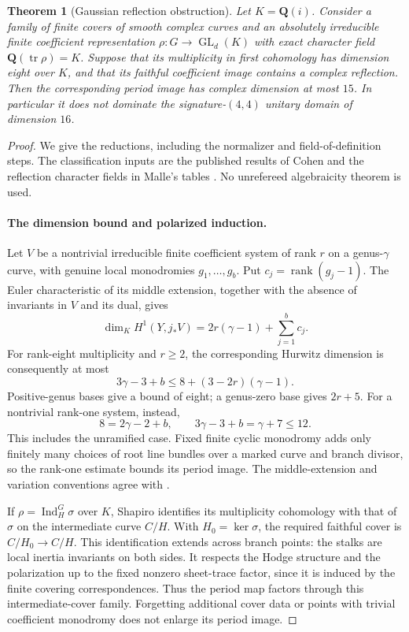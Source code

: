 \documentclass[11pt]{article}
\newtheorem{theorem}{Theorem}[section]
\theoremstyle{definition}
\theoremstyle{remark}
\newcommand{\Q}{\mathbf Q}
\begin{document}
\begin{theorem}[Gaussian reflection obstruction]\label{thm:gaussian-reflections}
Let $K=\Q(i)$. Consider a family of finite covers of smooth complex
curves and an absolutely irreducible finite coefficient representation
$\rho:G\to\operatorname{GL}_d(K)$ with exact character field
$\Q(\operatorname{tr}\rho)=K$. Suppose that its multiplicity in first
cohomology has dimension eight over $K$, and that its faithful coefficient
image contains a complex reflection. Then the corresponding period image
has complex dimension at most $15$. In particular it does not dominate
the signature-$(4,4)$ unitary domain of dimension $16$.
\end{theorem}

\begin{proof}
We give the reductions, including the normalizer and field-of-definition
steps. The classification inputs are the published results of Cohen
\cite{CohenReflection,CohenCorrection} and the reflection character fields
in Malle's tables \cite{MalleFields}. No unrefereed algebraicity theorem
is used.

\paragraph{The dimension bound and polarized induction.}
Let $V$ be a nontrivial irreducible finite coefficient system of rank $r$
on a genus-$\gamma$ curve, with genuine local monodromies $g_1,\ldots,g_b$.
Put $c_j=\operatorname{rank}(g_j-1)$. The Euler characteristic of its middle extension,
together with the absence of invariants in $V$ and its dual, gives
\[
 \dim_K H^1(Y,j_*V)=2r(\gamma-1)+\sum_{j=1}^b c_j.
 \label{eq:curve-euler}
\]
For rank-eight multiplicity and $r\ge2$, the corresponding Hurwitz
dimension is consequently at most
\[
 3\gamma-3+b\le8+(3-2r)(\gamma-1).
 \label{eq:curve-dimension}
\]
Positive-genus bases give a bound of eight; a genus-zero base gives
$2r+5$. For a nontrivial rank-one system, instead,
\[
 8=2\gamma-2+b,
 \qquad 3\gamma-3+b=\gamma+7\le12.
 \label{eq:rank-one-curve-dimension}
\]
This includes the unramified case. Fixed finite cyclic monodromy adds
only finitely many choices of root line bundles over a marked curve and
branch divisor, so the rank-one estimate bounds its period image. The middle-extension and
variation conventions agree with \cite[Proposition~1.1, Lemma~1.2,
Remark~1.3 and Theorem~2.5]{DettweilerWewers}.

If $\rho=\operatorname{Ind}_H^G\sigma$ over $K$, Shapiro identifies its multiplicity
cohomology with that of $\sigma$ on the intermediate curve
$C/H$. With $H_0=\ker\sigma$, the required faithful cover is
$C/H_0\to C/H$. This identification extends across branch points:
the stalks are local inertia invariants on both sides. It respects the
Hodge structure and the polarization up to the fixed nonzero sheet-trace
factor, since it is induced by the finite covering correspondences.
Thus the period map factors through this intermediate-cover family.
Forgetting additional cover data or points with trivial coefficient
monodromy does not enlarge its period image.


\end{proof}
\end{document}
